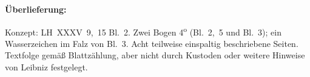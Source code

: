 %
%
%
\begin{ledgroupsized}[r]{120mm}
\footnotesize
\pstart
\noindent\textbf{Überlieferung:}
\pend
\end{ledgroupsized}
\begin{ledgroupsized}[r]{114mm}
\footnotesize
\pstart \parindent -6mm
%
Konzept: LH~XXXV~9,~15 Bl.~2.
Zwei Bogen 4\textsuperscript{o} (Bl.~2,~5 und Bl.~3);
ein Wasserzeichen im Falz von Bl.~3. %
Acht teilweise einspaltig beschriebene Seiten.
Textfolge gemäß Blattzählung, aber nicht durch Kustoden oder weitere Hinweise von Leibniz festgelegt.
\pend
\end{ledgroupsized}
%
\vspace*{5mm}
